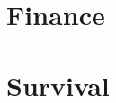 \documentclass[a4paper]{proc}
\begin{document}

  \section{Finance}



  \section{Survival}
\end{document}
